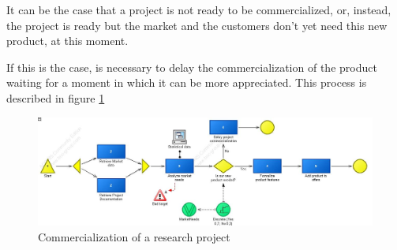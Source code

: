It can be the case that a project is not ready to be commercialized, or,
instead, the project is ready but the market and the customers don't yet
need this new product, at this moment.

If this is the case, is necessary to delay the commercialization of the
product waiting for a moment in which it can be more appreciated.
This process is described in figure \ref{2img:commerce}

\begin{figure}[!ht]
\begin{centering}
\includegraphics[scale=0.45,angle=90]{assign2/adonis/imgs/commercialize.jpg}
\caption{Commercialization of a research project}
\label{2img:commerce}
\end{centering}
\end{figure}



